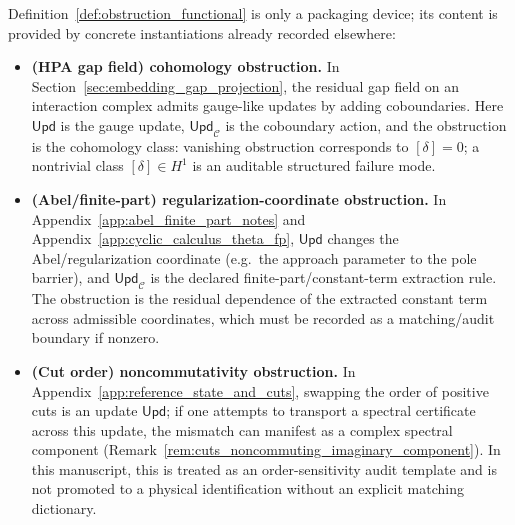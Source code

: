 \begin{remark}\label{rem:obstruction_functional_instances}
\AuditTag Definition~\ref{def:obstruction_functional} is only a packaging device; its content is provided by concrete instantiations already recorded elsewhere:
\begin{itemize}
\item \textbf{(HPA gap field) cohomology obstruction.}
In Section~\ref{sec:embedding_gap_projection}, the residual gap field on an interaction complex admits gauge-like updates by adding coboundaries.
Here $\mathsf{Upd}$ is the gauge update, $\mathsf{Upd}_{\mathcal{C}}$ is the coboundary action, and the obstruction is the cohomology class:
vanishing obstruction corresponds to $[\delta]=0$; a nontrivial class $[\delta]\in H^1$ is an auditable structured failure mode.
\item \textbf{(Abel/finite-part) regularization-coordinate obstruction.}
In Appendix~\ref{app:abel_finite_part_notes} and Appendix~\ref{app:cyclic_calculus_theta_fp}, $\mathsf{Upd}$ changes the Abel/regularization coordinate (e.g.\ the approach parameter to the pole barrier),
and $\mathsf{Upd}_{\mathcal{C}}$ is the declared finite-part/constant-term extraction rule.
The obstruction is the residual dependence of the extracted constant term across admissible coordinates, which must be recorded as a matching/audit boundary if nonzero.
\item \textbf{(Cut order) noncommutativity obstruction.}
In Appendix~\ref{app:reference_state_and_cuts}, swapping the order of positive cuts is an update $\mathsf{Upd}$; if one attempts to transport a spectral certificate across this update,
the mismatch can manifest as a complex spectral component (Remark~\ref{rem:cuts_noncommuting_imaginary_component}).
In this manuscript, this is treated as an order-sensitivity audit template and is not promoted to a physical identification without an explicit matching dictionary.
\end{itemize}
\end{remark}

